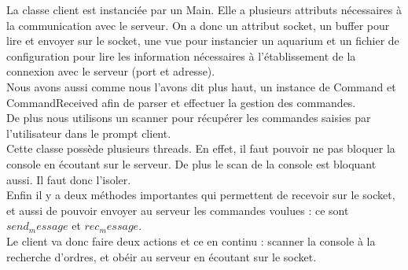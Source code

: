 \indent La classe client est instanciée par un Main. Elle a plusieurs attributs nécessaires à la communication avec le serveur.
On a donc un attribut socket, un buffer pour lire et envoyer sur le socket, une vue pour instancier un aquarium
et un fichier de configuration pour lire les information nécessaires à l'établissement de la connexion avec le serveur (port et adresse). \\Nous avons aussi comme nous l'avons dit plus haut, un instance de Command et CommandReceived afin de parser
et effectuer la gestion des commandes.\\
De plus nous utilisons un scanner pour récupérer les commandes saisies par l'utilisateur
dans le prompt client.\\
Cette classe possède plusieurs threads. En effet, il faut pouvoir ne pas bloquer la console en écoutant sur le serveur. De plus le scan de
la console est bloquant aussi. Il faut donc l'isoler.\\
Enfin il y a deux méthodes importantes qui permettent de recevoir sur le socket, et
aussi de pouvoir envoyer au serveur les commandes voulues : ce sont $send_message$ et $rec_message$.\\
Le client va donc faire deux actions
et ce en continu : scanner la console à la recherche d'ordres, et obéir au serveur en écoutant sur le socket.
